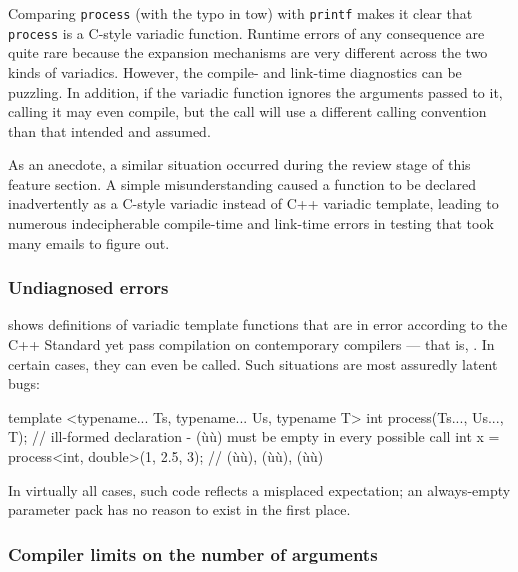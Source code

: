 \noindent Comparing \lstinline!process! (with the typo in tow) with \lstinline!printf!
makes it clear that \lstinline!process! is a C-style variadic function.
Runtime errors of any consequence are quite rare because the expansion
mechanisms are very different across the two kinds of variadics.
However, the compile- and link-time diagnostics can be puzzling. In
addition, if the variadic function ignores the arguments passed to it,
calling it may even compile, but the call will use a different calling
convention than that intended and assumed.

As an anecdote, a similar situation occurred during the review stage of
this feature section. A simple misunderstanding caused a function to be
declared inadvertently as a C-style variadic instead of C++ variadic
template, leading to numerous indecipherable compile-time and link-time
errors in testing that took many emails to figure out.

\subsubsection[Undiagnosed errors]{Undiagnosed errors}\label{undiagnosed-errors}

shows definitions of variadic template functions that are in error
according to the C++ Standard yet pass compilation on contemporary
compilers --- that is, . In certain cases, they can even
be called. Such situations are most assuredly latent bugs:

\begin{emcppslisting}[emcppsbatch=e40]
template <typename... Ts, typename... Us, typename T>
int process(Ts..., Us..., T);
    // ill-formed declaration - (ù{}ù) must be empty in every possible call
int x = process<int, double>(1, 2.5, 3);
    // (ù{}ù), (ù{}ù), (ù{}ù)
\end{emcppslisting}
    

\noindent In virtually all cases, such code reflects a misplaced expectation; an
always-empty parameter pack has no reason to exist in the first place.

\subsubsection[Compiler limits on the number of arguments]{Compiler limits on the number of arguments}\label{compiler-limits-on-the-number-of-arguments}

